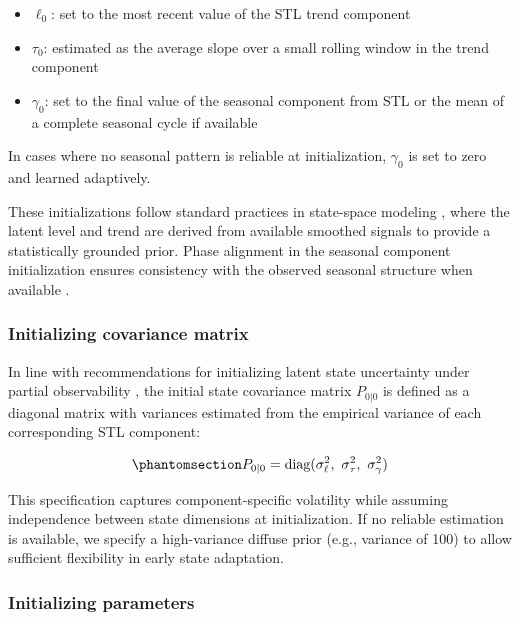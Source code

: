 \documentclass[
  authoryear,
  doubleblind,
  3p]{elsarticle}
\providecommand{\tightlist}{%
  \setlength{\itemsep}{0pt}\setlength{\parskip}{0pt}}
\begin{document}
\begin{itemize}
\tightlist
\item
  \(\ell_0\): set to the most recent value of the STL trend component
\item
  \(\tau_0\): estimated as the average slope over a small rolling window
  in the trend component
\item
  \(\gamma_0\): set to the final value of the seasonal component from
  STL or the mean of a complete seasonal cycle if available
\end{itemize}

In cases where no seasonal pattern is reliable at initialization,
\(\gamma_0\) is set to zero and learned adaptively.

These initializations follow standard practices in state-space modeling
\citep{durbin2012, harvey1990}, where the latent level and trend are
derived from available smoothed signals to provide a statistically
grounded prior. Phase alignment in the seasonal component initialization
ensures consistency with the observed seasonal structure when available
\citep{harvey1990}.

\subsubsection{Initializing covariance
matrix}\label{initializing-covariance-matrix}

In line with recommendations for initializing latent state uncertainty
under partial observability \citep{west1997}, the initial state
covariance matrix \(P_{0|0}\) is defined as a diagonal matrix with
variances estimated from the empirical variance of each corresponding
STL component:

\begin{equation}\phantomsection\label{eq-eleven}{
P_{0|0} = \text{diag}(\sigma^2_{\ell},\ \sigma^2_{\tau},\ \sigma^2_{\gamma})
}\end{equation}

This specification captures component-specific volatility while assuming
independence between state dimensions at initialization. If no reliable
estimation is available, we specify a high-variance diffuse prior (e.g.,
variance of 100) to allow sufficient flexibility in early state
adaptation.

\subsubsection{Initializing parameters}\label{initializing-parameters}
\end{document}
